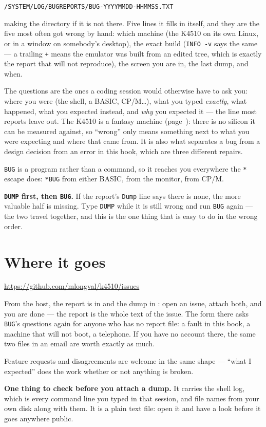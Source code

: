 \begin{center}
\texttt{/SYSTEM/LOG/BUGREPORTS/BUG-YYYYMMDD-HHMMSS.TXT}
\end{center}

\noindent making the directory if it is not there. Five lines it fills
in itself, and they are the five most often got wrong by hand: which
machine (the K4510 on its own Linux, or in a window on somebody's
desktop), the exact build
(\verb|INFO -v| says the same --- a trailing \verb|+| means the emulator
was built from an edited tree, which is exactly the report that will not
reproduce), the screen you are in, the last dump, and when.

The questions are the ones a coding session would otherwise have to ask
you: where you were (the shell, a BASIC, CP/M\ldots), what you typed
\emph{exactly}, what happened, what you expected instead, and \emph{why}
you expected it --- the line most reports leave out. The K4510 is a
fantasy machine (page~\pageref{cha:disclaimer}): there is no silicon it
can be measured against, so ``wrong'' only means something next to what
you were expecting and where that came from. It is also what separates a
bug from a design decision from an error in this book, which are three
different repairs.

\verb|BUG| is a program rather than a command, so it reaches you
everywhere the \texttt{*} escape does: \verb|*BUG| from either BASIC,
from the monitor, from CP/M.

\begin{aside}
\textbf{\texttt{DUMP} first, then \texttt{BUG}.} If the report's
\texttt{Dump} line says there is none, the more valuable half is missing.
Type \verb|DUMP| while it is still wrong and run \verb|BUG| again ---
the two travel together, and this is the one thing that is easy to do in
the wrong order.
\end{aside}

\section{Where it goes}
\begin{center}
\url{https://github.com/mlongval/k4510/issues}
\end{center}

\noindent From the host, the report is in  and
the dump in : open an issue, attach both, and you are done ---
the report is the whole text of the issue. The form there asks
\verb|BUG|'s questions again for anyone who has no report file: a fault
in this book, a machine that will not boot, a telephone. If you have no
account there, the same two files in an email are worth exactly as much.

Feature requests and disagreements are welcome in the same shape ---
``what I expected'' does the work whether or not anything is broken.

\begin{aside}
\textbf{One thing to check before you attach a dump.} It carries the
shell log, which is every command line you typed in that session, and
file names from your own disk along with them. It is a plain text file:
open it and have a look before it goes anywhere public.
\end{aside}
